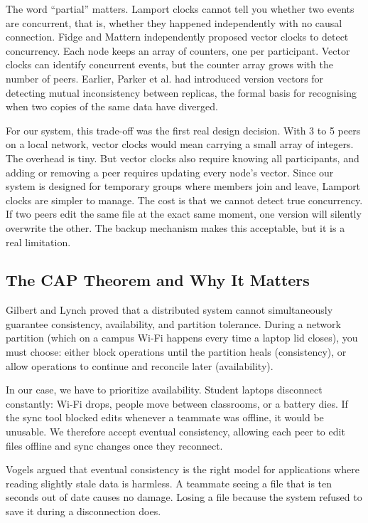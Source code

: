 The word ``partial'' matters. Lamport clocks cannot tell you whether two events are concurrent, that is, whether they happened independently with no causal connection. Fidge \citeyear{fidge1988} and Mattern independently proposed vector clocks to detect concurrency. Each node keeps an array of counters, one per participant. Vector clocks can identify concurrent events, but the counter array grows with the number of peers. Earlier, Parker et al. \citeyear{parker1983} had introduced version vectors for detecting mutual inconsistency between replicas, the formal basis for recognising when two copies of the same data have diverged.

For our system, this trade-off was the first real design decision. With 3 to 5 peers on a local network, vector clocks would mean carrying a small array of integers. The overhead is tiny. But vector clocks also require knowing all participants, and adding or removing a peer requires updating every node's vector. Since our system is designed for temporary groups where members join and leave, Lamport clocks are simpler to manage. The cost is that we cannot detect true concurrency. If two peers edit the same file at the exact same moment, one version will silently overwrite the other. The backup mechanism makes this acceptable, but it is a real limitation.

\subsection{The CAP Theorem and Why It Matters}

Gilbert and Lynch \citeyear{brewer2002} proved that a distributed system cannot simultaneously guarantee consistency, availability, and partition tolerance. During a network partition (which on a campus Wi-Fi happens every time a laptop lid closes), you must choose: either block operations until the partition heals (consistency), or allow operations to continue and reconcile later (availability).

In our case, we have to prioritize availability. Student laptops disconnect constantly: Wi-Fi drops, people move between classrooms, or a battery dies. If the sync tool blocked edits whenever a teammate was offline, it would be unusable. We therefore accept eventual consistency, allowing each peer to edit files offline and sync changes once they reconnect.

Vogels \citeyear{vogels2009} argued that eventual consistency is the right model for applications where reading slightly stale data is harmless. A teammate seeing a file that is ten seconds out of date causes no damage. Losing a file because the system refused to save it during a disconnection does.

